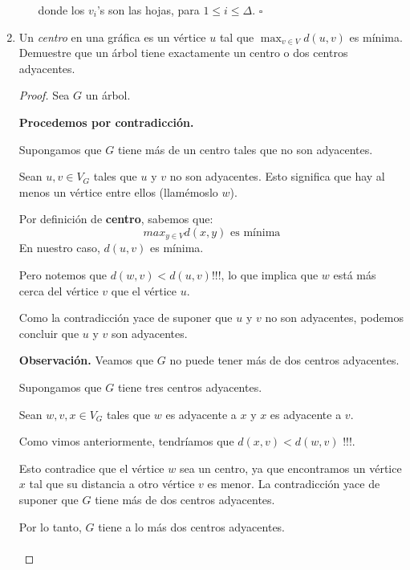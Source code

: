 \documentclass{article}
\begin{document}
\begin{enumerate}
\begin{enumerate}
        donde los $v_i$'s son las hojas, para $1 \leq i \leq \Delta$.
        \hfill $\square$
        \end{enumerate}

    \item Un {\em centro} en una gr\'afica es un v\'ertice
      $u$ tal que $\max_{v \in V} d(u, v)$ es m\'inima.
      Demuestre que un \'arbol tiene exactamente un centro
      o dos centros adyacentes.

      \renewcommand\qedsymbol{QED}
      \begin{proof}
        Sea $G$ un árbol.

        \textbf{Procedemos por contradicción.}

        Supongamos que $G$ tiene más de un centro tales que no son adyacentes.

        Sean $u, v \in V_{G}$ tales que $u$ y $v$ no son adyacentes.
        Esto significa que hay al menos un vértice entre ellos (llamémoslo $w$).

        Por definición de \textbf{centro}, sabemos que:
        $$max_{y \in V}d(x,y) \text{ es mínima}$$
        En nuestro caso, $d(u, v)$ es mínima.

        Pero notemos que $d(w, v) < d(u, v)$!!!, lo que implica que $w$ est\'a m\'as
        cerca del v\'ertice $v$ que el v\'ertice $u$.

        Como la contradicción yace de suponer que $u$ y $v$ no son adyacentes, podemos
        concluir que $u$ y $v$ son adyacentes.

        \textbf{Observación.} Veamos que $G$ no puede tener más de dos centros adyacentes.

        Supongamos que $G$ tiene tres centros adyacentes.

        Sean $w, v, x \in V_{G}$ tales que $w$ es adyacente a $x$ y $x$ es adyacente a $v$.

        Como vimos anteriormente, tendríamos que $d(x, v) < d(w, v)$ !!!.

        Esto contradice que el vértice $w$ sea un centro, ya que encontramos un vértice
        $x$ tal que su distancia a otro vértice $v$ es menor.
        La contradicción yace de suponer que $G$ tiene más de dos centros adyacentes.

        Por lo tanto, $G$ tiene a lo más dos centros adyacentes. \\
        \\
      \end{proof}


\end{enumerate}
\end{document}
